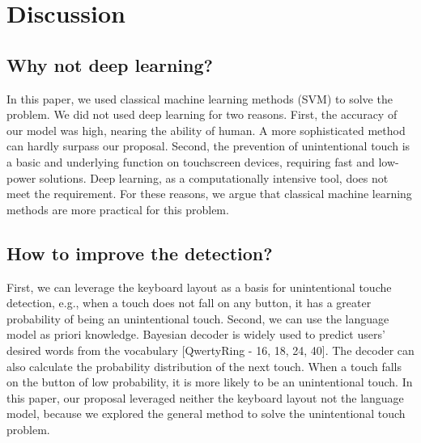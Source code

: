 \section{Discussion}

\subsection{Why not deep learning?}


In this paper, we used classical machine learning methods (SVM) to solve the problem. We did not used deep learning for two reasons. First, the accuracy of our model was high, nearing the ability of human. A more sophisticated method can hardly surpass our proposal. Second, the prevention of unintentional touch is a basic and underlying function on touchscreen devices, requiring fast and low-power solutions. Deep learning, as a computationally intensive tool, does not meet the requirement. For these reasons, we argue that classical machine learning methods are more practical for this problem.

\subsection{How to improve the detection?}

First, we can leverage the keyboard layout as a basis for unintentional touche detection, e.g., when a touch does not fall on any button, it has a greater probability of being an unintentional touch. Second, we can use the language model as priori knowledge. Bayesian decoder is widely used to predict users’ desired words from the vocabulary [QwertyRing - 16, 18, 24, 40]. The decoder can also calculate the probability distribution of the next touch. When a touch falls on the button of low probability, it is more likely to be an unintentional touch. In this paper, our proposal leveraged neither the keyboard layout not the language model, because we explored the general method to solve the unintentional touch problem.

